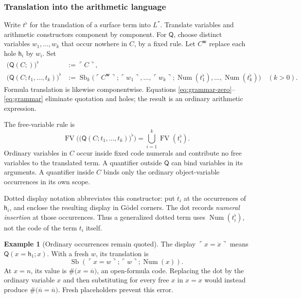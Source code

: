 \documentclass[11pt]{article}
\newcommand{\Num}{\operatorname{Num}}
\newcommand{\Sb}{\operatorname{Sb}}
\newcommand{\FV}{\operatorname{FV}}
\newcommand{\Q}{\mathsf Q}
\newcommand{\h}{\mathsf h}
\newcommand{\code}[1]{\#\bigl(#1\bigr)}
\newcommand{\quo}[1]{\ulcorner #1\urcorner}
\newcommand{\bn}[1]{\overline{#1}}
\newcommand{\flatof}[1]{\bigl(#1\bigr)^{\flat}}
\newcommand{\defeq}{\mathrel{:=}}
\theoremstyle{definition}
\newtheorem{example}[proposition]{Example}
\begin{document}
\subsubsection*{Translation into the arithmetic language}
Write $t^{\flat}$ for the translation of a surface term into $L^{*}$.
Translate variables and arithmetic constructors component by component.
For $\Q$, choose distinct variables $w_1,\ldots,w_k$ that occur nowhere
in $C$, by a fixed rule. Let $C^{\mathbf w}$ replace each hole
$\h_i$ by $w_i$. Set
\begin{align}
 \flatof{\Q(C;)}&\defeq\quo C,\label{eq:grammar-zero}\\
 \flatof{\Q(C;t_1,\ldots,t_k)}
 &\defeq\Sb_k\bigl(\quo{C^{\mathbf w}};
       \quo{w_1},\ldots,\quo{w_k};
       \Num(t_1^{\flat}),\ldots,\Num(t_k^{\flat})\bigr)
       \quad(k>0).\label{eq:grammar}
\end{align}
Formula translation is likewise componentwise. Equations
\eqref{eq:grammar-zero}--\eqref{eq:grammar} eliminate quotation and holes;
the result is an ordinary arithmetic expression.

The free-variable rule is
\begin{equation}\label{eq:fv}
 \FV\bigl(\flatof{\Q(C;t_1,\ldots,t_k)}\bigr)
   =\bigcup_{i=1}^{k}\FV(t_i^{\flat}).
\end{equation}
Ordinary variables in $C$ occur inside fixed code numerals and contribute
no free variables to the translated term. A quantifier outside $\Q$
can bind variables in its arguments. A quantifier inside $C$ binds
only the ordinary object-variable occurrences in its own scope.

Dotted display notation abbreviates this constructor: put $\dot t_i$
at the occurrences of $\h_i$, and enclose the resulting display in
G\"odel corners. The dot records \emph{numeral insertion} at those
occurrences. Thus a generalized dotted term uses $\Num(t_i^{\flat})$,
not the code of the term $t_i$ itself.

\begin{example}[Ordinary occurrences remain quoted]\label{ex:mixed}
The display $\quo{x=\dot x}$ means $\Q(x=\h_1;x)$. With a fresh $w$,
its translation is
\[
  \Sb(\quo{x=w};\quo w;\Num(x)).
\]
At $x=n$, its value is $\code{x=\bn n}$, an open-formula code.
Replacing the dot by the ordinary variable $x$ and then substituting
for every free $x$ in $x=x$ would instead produce
$\code{\bn n=\bn n}$. Fresh placeholders prevent this error.
\end{example}
\end{document}
